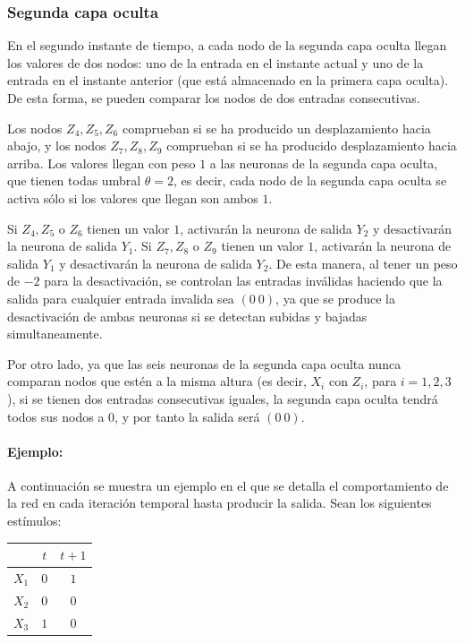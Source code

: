 \documentclass[spanish]{assignment}
\begin{document}
	\subsubsection{Segunda capa oculta}
	En el segundo instante de tiempo, a cada nodo de la segunda capa oculta llegan los valores de dos nodos: uno de la entrada en el instante actual y uno de la entrada en el instante anterior (que está almacenado en la primera capa oculta). De esta forma, se pueden comparar los nodos de dos entradas consecutivas.
	
	Los nodos $Z_4, Z_5, Z_6$ comprueban si se ha producido un desplazamiento hacia abajo, y los nodos $Z_7, Z_8, Z_9$ comprueban si se ha producido desplazamiento hacia arriba.	Los valores llegan con peso $1$ a las neuronas de la segunda capa oculta, que tienen todas umbral $\theta=2$, es decir, cada nodo de la segunda capa oculta se activa sólo si los valores que llegan son ambos $1$.
	
	Si $Z_4, Z_5$ o $Z_6$ tienen un valor $1$, activarán la neurona de salida $Y_2$ y desactivarán la neurona de salida $Y_1$. Si $Z_7, Z_8$ o $Z_9$ tienen un valor $1$, activarán la neurona de salida $Y_1$ y desactivarán la neurona de salida $Y_2$. De esta manera, al tener un peso de $-2$ para la desactivación, se controlan las entradas inválidas haciendo que la salida para cualquier entrada invalida sea $(0\ 0)$, ya que se produce la desactivación de ambas neuronas si se detectan subidas y bajadas simultaneamente.
	
	Por otro lado, ya que las seis neuronas de la segunda capa oculta nunca comparan nodos que estén a la misma altura (es decir, $X_i$ con $Z_i$, para $i=1,2,3$), si se tienen dos entradas consecutivas iguales, la segunda capa oculta tendrá todos sus nodos a $0$, y por tanto la salida será $(0\ 0)$.

	\newpage
	\paragraph{Ejemplo:}
	A continuación se muestra un ejemplo en el que se detalla el comportamiento de la red en cada iteración temporal hasta producir la salida. Sean los siguientes estímulos:
	\begin{center}
		\begin{tabular}{c|c|c|}
			& $t$ & $t+1$ \\
			\hline
			$X_1$ & $0$ & $1$   \\
			$X_2$ & $0$ & $0$   \\
			$X_3$ & $1$ & $0$  
		\end{tabular}
	\end{center}
	
\end{document}
